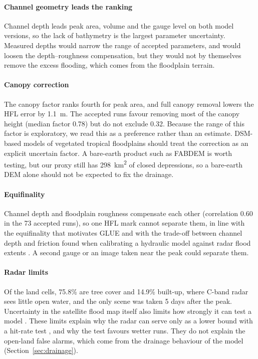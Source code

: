 \documentclass[preprint,12pt,authoryear]{elsarticle}
\newcommand{\kmsq}{km\textsuperscript{2}}
\begin{document}
\paragraph{Channel geometry leads the ranking}
Channel depth leads peak area, volume and the gauge level on both model versions, so the lack of bathymetry is the largest parameter uncertainty. Measured depths would narrow the range of accepted parameters, and would loosen the depth--roughness compensation, but they would not by themselves remove the excess flooding, which comes from the floodplain terrain.

\paragraph{Canopy correction}
The canopy factor ranks fourth for peak area, and full canopy removal lowers the HFL error by 1.1~m. The accepted runs favour removing most of the canopy height (median factor 0.78) but do not exclude 0.32. Because the range of this factor is exploratory, we read this as a preference rather than an estimate. DSM-based models of vegetated tropical floodplains should treat the correction as an explicit uncertain factor. A bare-earth product such as FABDEM \citep{hawker2022} is worth testing, but our proxy still has 298~\kmsq{} of closed depressions, so a bare-earth DEM alone should not be expected to fix the drainage.

\paragraph{Equifinality}
Channel depth and floodplain roughness compensate each other (correlation 0.60 in the 73 accepted runs), so one HFL mark cannot separate them, in line with the equifinality that motivates GLUE \citep{beven1992} and with the trade-off between channel depth and friction found when calibrating a hydraulic model against radar flood extents \citep{wood2016}. A second gauge or an image taken near the peak could separate them.

\paragraph{Radar limits}
Of the land cells, 75.8\% are tree cover and 14.9\% built-up, where C-band radar sees little open water, and the only scene was taken 5 days after the peak. Uncertainty in the satellite flood map itself also limits how strongly it can test a model \citep{stephens2012}. These limits explain why the radar can serve only as a lower bound with a hit-rate test \citep[rather than as a binary pattern to match;][]{aronica2002}, and why the test favours wetter runs. They do not explain the open-land false alarms, which come from the drainage behaviour of the model (Section~\ref{sec:drainage}).
\end{document}
